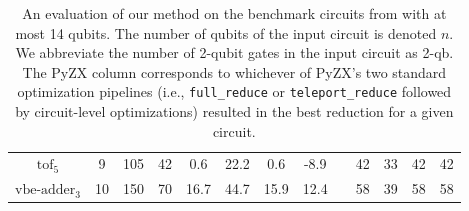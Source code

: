 \begin{table}[t]
\begin{tabular}{@{}ccccccccccccc@{}}
$\text{tof}_5$               & 9  & 105  & 42  & 0.6  & 22.2  & 0.6  & -8.9  &  & 42  & 33  & 42  & 42  \\
$\text{vbe-adder}_3$         & 10 & 150  & 70  & 16.7 & 44.7  & 15.9 & 12.4  &  & 58  & 39  & 58  & 58  \\ \bottomrule
\end{tabular}
\caption{\label{tab:bench}
  An evaluation of our method on the benchmark circuits from \cite{kissinger2019reducing} with at most 14 qubits.
  The number of qubits of the input circuit is denoted $n$.
  We abbreviate the number of 2-qubit gates in the input circuit as 2-qb.
  The PyZX column corresponds to whichever of PyZX's two standard optimization pipelines (i.e., {\color{gray}\texttt{full\_reduce}} or {\color{gray}\texttt{teleport\_reduce}} followed by circuit-level optimizations) resulted in the best reduction for a given circuit.
}
\end{table}


